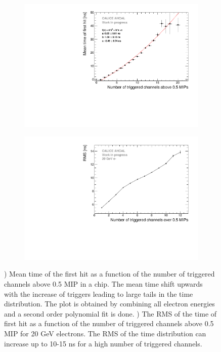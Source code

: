 \begin{figure}[htbp!]
	\begin{subfigure}[t]{0.5\textwidth}
		\centering
		\includegraphics[width=1\textwidth]{../Thesis_Plots/Timing/Electrons/Plots/NumberHits_Dependance_AllEnergies.pdf}
		\caption{}\label{fig:nhits_profile}
	\end{subfigure}
	\hfill
	\begin{subfigure}[t]{0.5\textwidth}
		\centering
		\includegraphics[width=1\textwidth]{../Thesis_Plots/Timing/Electrons/Plots/ParametrisationPedestalShift_20GeV.pdf}
		\caption{}\label{fig:RMS_nHits}
	\end{subfigure}
	\caption{) Mean time of the first hit as a function of the number of triggered channels above 0.5 MIP in a chip. The mean time shift upwards with the increase of triggers leading to large tails in the time distribution. The plot is obtained by combining all electron energies and a second order polynomial fit is done. ) The RMS of the time of first hit as a function of the number of triggered channels above 0.5 MIP for 20 GeV electrons. The RMS of the time distribution can increase up to 10-15 ns for a high number of triggered channels.}
\end{figure}

